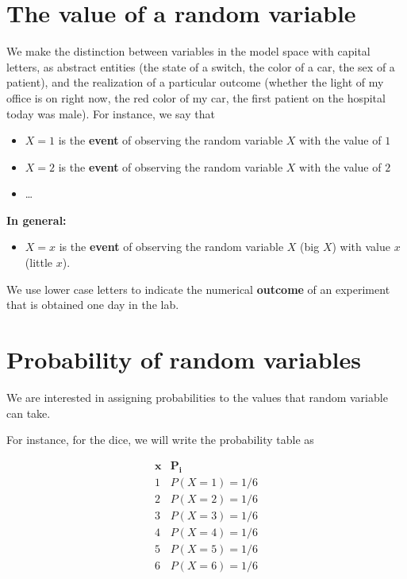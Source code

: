 \documentclass[
]{book}
\providecommand{\tightlist}{%
  \setlength{\itemsep}{0pt}\setlength{\parskip}{0pt}}
\begin{document}
\hypertarget{the-value-of-a-random-variable}{%
\section{The value of a random variable}\label{the-value-of-a-random-variable}}

We make the distinction between variables in the model space with capital letters, as abstract entities (the state of a switch, the color of a car, the sex of a patient), and the realization of a particular outcome (whether the light of my office is on right now, the red color of my car, the first patient on the hospital today was male). For instance, we say that

\begin{itemize}
\item
  \(X=1\) is the \textbf{event} of observing the random variable \(X\) with the value of \(1\)
\item
  \(X=2\) is the \textbf{event} of observing the random variable \(X\) with the value of \(2\)
\item
  \ldots{}
\end{itemize}

\textbf{In general:}

\begin{itemize}
\tightlist
\item
  \(X=x\) is the \textbf{event} of observing the random variable \(X\) (big \(X\)) with value \(x\) (little \(x\)).
\end{itemize}

We use lower case letters to indicate the numerical \textbf{outcome} of an experiment that is obtained one day in the lab.

\hypertarget{probability-of-random-variables}{%
\section{Probability of random variables}\label{probability-of-random-variables}}

We are interested in assigning probabilities to the values that random variable can take.

For instance, for the dice, we will write the probability table as

\[
\begin{array}{cc}
\mathbf{x} & \mathbf{P_i} \\
1 & P(X=1) = 1/6 \\
2 & P(X=2) = 1/6 \\
3 & P(X=3) = 1/6 \\
4 & P(X=4) = 1/6 \\
5 & P(X=5) = 1/6 \\
6 & P(X=6) = 1/6 \\
\end{array}
\]
\end{document}
